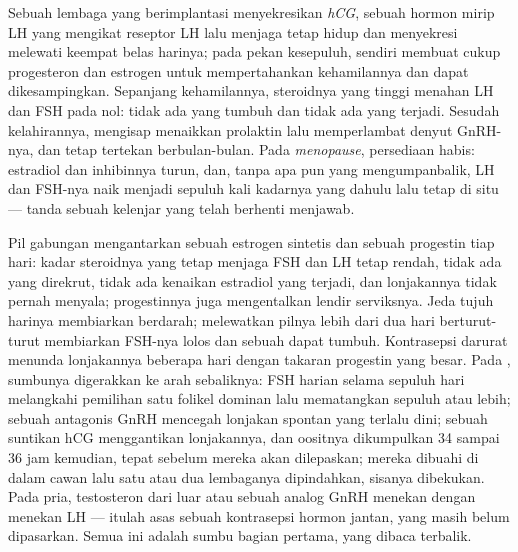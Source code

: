 \begin{proposition}\label{prop:b2:reproductive-hormones:overrides}
Sebuah lembaga yang berimplantasi menyekresikan \emph{hCG}, sebuah
hormon mirip LH yang mengikat reseptor LH lalu menjaga 
tetap hidup dan menyekresi melewati keempat belas harinya; pada pekan
kesepuluh,  sendiri membuat cukup progesteron dan estrogen
untuk mempertahankan kehamilannya dan  dapat
dikesampingkan. Sepanjang kehamilannya, steroidnya yang tinggi menahan
LH dan FSH pada nol: tidak ada  yang tumbuh dan tidak ada
 yang terjadi. Sesudah kelahirannya, mengisap menaikkan
prolaktin lalu memperlambat denyut GnRH-nya, dan  tetap
tertekan berbulan-bulan. Pada \emph{menopause}, persediaan 
habis: estradiol dan inhibinnya turun, dan, tanpa apa pun yang
mengumpanbalik, LH dan FSH-nya naik menjadi sepuluh kali kadarnya yang
dahulu lalu tetap di situ --- tanda sebuah kelenjar yang telah berhenti
menjawab.
\end{proposition}

\begin{proposition}\label{prop:b2:reproductive-hormones:clinic}
Pil gabungan mengantarkan sebuah estrogen sintetis dan sebuah
progestin tiap hari: kadar steroidnya yang tetap menjaga FSH dan LH
tetap rendah, tidak ada  yang direkrut, tidak ada kenaikan
estradiol yang terjadi, dan lonjakannya tidak pernah menyala;
progestinnya juga mengentalkan lendir serviksnya. Jeda tujuh harinya
membiarkan  berdarah; melewatkan pilnya lebih dari dua
hari berturut-turut membiarkan FSH-nya lolos dan sebuah  dapat
tumbuh. Kontrasepsi darurat menunda lonjakannya beberapa hari dengan
takaran progestin yang besar. Pada \emph{},
sumbunya digerakkan ke arah sebaliknya: FSH harian selama sepuluh hari
melangkahi pemilihan satu folikel dominan lalu mematangkan sepuluh atau
lebih; sebuah antagonis GnRH mencegah lonjakan spontan yang terlalu
dini; sebuah suntikan hCG menggantikan lonjakannya, dan oositnya
dikumpulkan 34 sampai 36 jam kemudian, tepat sebelum mereka akan
dilepaskan; mereka dibuahi di dalam cawan lalu satu atau dua lembaganya
dipindahkan, sisanya dibekukan. Pada pria, testosteron dari luar atau
sebuah analog GnRH menekan  dengan menekan LH --- itulah
asas sebuah kontrasepsi hormon jantan, yang masih belum dipasarkan.
Semua ini adalah sumbu bagian pertama, yang dibaca terbalik.
\end{proposition}

